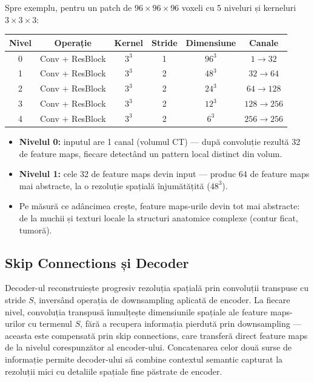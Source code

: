 \documentclass[12pt, a4paper]{report}
\begin{document}
Spre exemplu, pentru un patch de $96 \times 96 \times 96$
voxeli cu 5 niveluri și kerneluri $3\times3\times3$:

\begin{center}
\begin{tabular}{cccccc}
    \toprule
    \textbf{Nivel} & \textbf{Operație} & \textbf{Kernel} &
    \textbf{Stride} & \textbf{Dimensiune} & \textbf{Canale} \\
    \midrule
    0 & Conv + ResBlock & $3^3$ & 1 & $96^3$ & $1   \to 32$  \\
    1 & Conv + ResBlock & $3^3$ & 2 & $48^3$ & $32  \to 64$  \\
    2 & Conv + ResBlock & $3^3$ & 2 & $24^3$ & $64  \to 128$ \\
    3 & Conv + ResBlock & $3^3$ & 2 & $12^3$ & $128 \to 256$ \\
    4 & Conv + ResBlock & $3^3$ & 2 & $6^3$  & $256 \to 256$ \\
    \bottomrule
\end{tabular}
\end{center}
\begin{itemize}
    \item \textbf{Nivelul 0:} inputul are 1 canal (volumul CT) ---
    după convoluție rezultă 32 de feature maps, fiecare detectând
    un pattern local distinct din volum.
    \item \textbf{Nivelul 1:} cele 32 de feature maps devin input
    --- produc 64 de feature maps mai abstracte, la o rezoluție
    spațială înjumătățită ($48^3$).
    \item Pe măsură ce adâncimea crește, feature maps-urile devin
    tot mai abstracte: de la muchii și texturi locale la structuri
    anatomice complexe (contur ficat, tumoră).
\end{itemize}


\subsection{Skip Connections și Decoder}
Decoder-ul reconstruiește progresiv rezoluția spațială prin
convoluții transpuse cu stride $S$, inversând operația de
downsampling aplicată de encoder. La fiecare nivel, convoluția
transpusă înmulțește dimensiunile spațiale ale feature maps-urilor cu termenul $S$,
fără a recupera informația pierdută prin downsampling — aceasta
este compensată prin skip connections, care transferă direct
feature maps de la nivelul corespunzător al encoder-ului.
Concatenarea celor două surse de informație permite decoder-ului
să combine contextul semantic capturat la rezoluții mici cu
detaliile spațiale fine păstrate de encoder.
\end{document}

